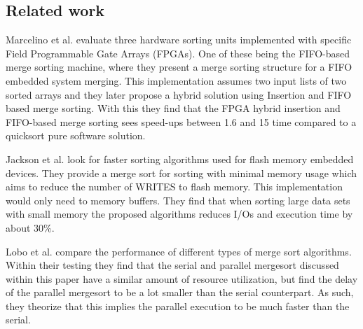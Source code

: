 \subsection{Related work}
Marcelino et al. \cite{sorting_units} evaluate three hardware sorting units
implemented with specific Field Programmable Gate Arrays (FPGAs). One of these
being the FIFO-based merge sorting machine, where they present a merge sorting
structure for a FIFO embedded system merging. This implementation assumes two
input lists of two sorted arrays and they later propose a hybrid solution using
Insertion and FIFO based merge sorting. With this they find that the FPGA hybrid
insertion and FIFO-based merge sorting sees speed-ups between 1.6 and 15 time
compared to a quicksort pure software solution.

Jackson et al. \cite{flash_sorting} look for faster sorting algorithms used for
flash memory embedded devices. They provide a merge sort for sorting with
minimal memory usage which aims to reduce the number of WRITES to flash memory.
This implementation would only need to memory buffers. They find that when
sorting large data sets with small memory the proposed algorithms reduces I/Os
and execution time by about 30\%.

Lobo et al. \cite{merge_sort} compare the performance of different types of
merge sort algorithms. Within their testing they find that the serial and
parallel mergesort discussed within this paper have a similar amount of resource
utilization, but find the delay of the parallel mergesort to be a lot smaller
than the serial counterpart. As such, they theorize that this implies the
parallel execution to be much faster than the serial.
